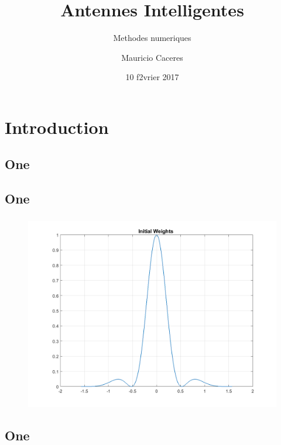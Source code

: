 \documentclass[11pt]{beamer}
\begin{document}
	\author{Mauricio Caceres}
	\title{Antennes Intelligentes}
	\subtitle{Methodes numeriques}
	\logo{}
	\date{10 f2vrier 2017}
	\subject{Présentation travail autonomme}
	\frame[plain]{\maketitle}
%
%
	\section{Introduction}
	\begin{frame}
	\subsection{One}
		\frametitle{}
	\end{frame}
%
%

\begin{frame}
	\subsection{One}
	\frametitle{}
	
	\begin{figure}
\centering
\includegraphics[width=0.3\linewidth]{../src/fiche1/exo2_1}
\caption{}
\label{fig:exo2_1}
\end{figure}

	
	
\end{frame}

\begin{frame}
	\subsection{One}
	\frametitle{}
\end{frame}
\end{document}
